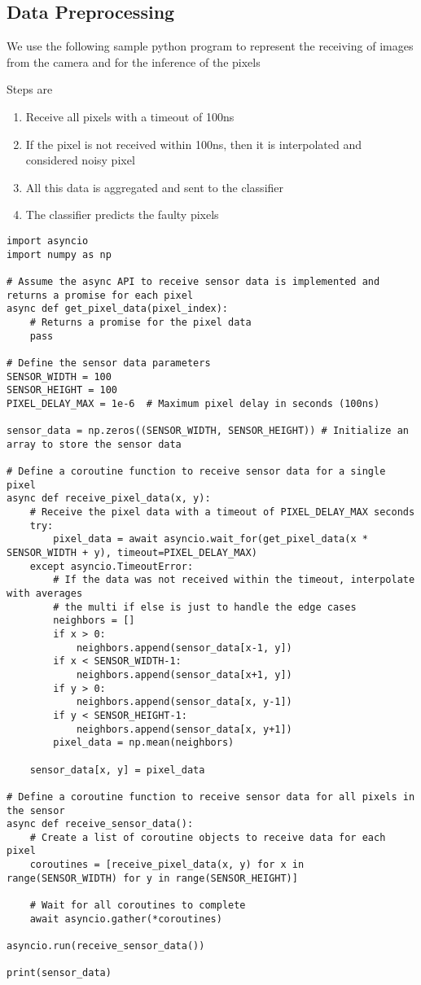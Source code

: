\documentclass[12pt]{article}
\numberwithin{equation}{section}
\begin{document}
\subsection{Data Preprocessing}
We use the following sample python program to represent the receiving of images from the camera and for the inference of the pixels

Steps are
\begin{enumerate}
  \item Receive all pixels with a timeout of 100ns
  \item If the pixel is not received within 100ns, then it is interpolated and considered noisy pixel
  \item All this data is aggregated and sent to the classifier
  \item The classifier predicts the faulty pixels
\end{enumerate}


\begin{verbatim}
import asyncio
import numpy as np

# Assume the async API to receive sensor data is implemented and returns a promise for each pixel
async def get_pixel_data(pixel_index):
    # Returns a promise for the pixel data
    pass

# Define the sensor data parameters
SENSOR_WIDTH = 100
SENSOR_HEIGHT = 100
PIXEL_DELAY_MAX = 1e-6  # Maximum pixel delay in seconds (100ns)

sensor_data = np.zeros((SENSOR_WIDTH, SENSOR_HEIGHT)) # Initialize an array to store the sensor data

# Define a coroutine function to receive sensor data for a single pixel
async def receive_pixel_data(x, y):
    # Receive the pixel data with a timeout of PIXEL_DELAY_MAX seconds
    try:
        pixel_data = await asyncio.wait_for(get_pixel_data(x * SENSOR_WIDTH + y), timeout=PIXEL_DELAY_MAX)
    except asyncio.TimeoutError:
        # If the data was not received within the timeout, interpolate with averages
        # the multi if else is just to handle the edge cases
        neighbors = []
        if x > 0:
            neighbors.append(sensor_data[x-1, y])
        if x < SENSOR_WIDTH-1:
            neighbors.append(sensor_data[x+1, y])
        if y > 0:
            neighbors.append(sensor_data[x, y-1])
        if y < SENSOR_HEIGHT-1:
            neighbors.append(sensor_data[x, y+1])
        pixel_data = np.mean(neighbors)

    sensor_data[x, y] = pixel_data

# Define a coroutine function to receive sensor data for all pixels in the sensor
async def receive_sensor_data():
    # Create a list of coroutine objects to receive data for each pixel
    coroutines = [receive_pixel_data(x, y) for x in range(SENSOR_WIDTH) for y in range(SENSOR_HEIGHT)]

    # Wait for all coroutines to complete
    await asyncio.gather(*coroutines)

asyncio.run(receive_sensor_data())

print(sensor_data)
\end{verbatim}
\end{document}
